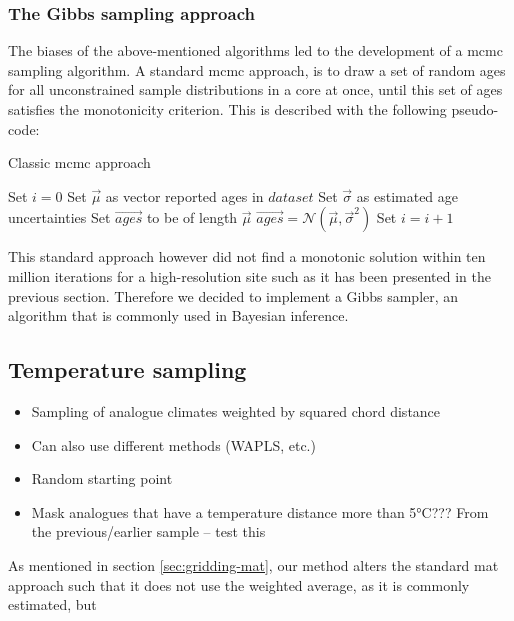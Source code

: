 \begin{refsection}
\subsubsection{The Gibbs sampling approach}
The biases of the above-mentioned algorithms led to the development of a \gls{mcmc} sampling algorithm. A standard \gls{mcmc} approach, is to draw a set of random ages for all unconstrained sample distributions in a core at once, until this set of ages satisfies the monotonicity criterion. This is described with the following pseudo-code:

\begin{algorithm}
	\renewcommand{\algorithmicensure}{\textbf{Output:}}
	\caption[Classic MCMC approach]{Classic \gls{mcmc} approach}
	\label{a:gridding-mcmc}
	\begin{algorithmic}[1]
		\STATE Set $i = 0$
		\STATE Set $\vec{\mu}$ as vector reported ages in $dataset$
		\STATE Set $\vec{\sigma}$ as estimated age uncertainties		
		\STATE Set $\vec{ages}$ to be of length $\vec{\mu}$
		\STATE $\vec{ages} = \mathcal{N}(\vec{\mu}, \vec{\sigma}^2)$
		\STATE Set $i = i + 1$
		\ENDWHILE
		\ENDFOR
	\end{algorithmic}
\end{algorithm}

This standard approach however did not find a monotonic solution within ten million iterations for a high-resolution site such as it has been presented in the previous section. Therefore we decided to implement a Gibbs sampler, an algorithm that is commonly used in Bayesian inference. 

\subsection{Temperature sampling}  \label{sec:gridding-temperature-sampling}
\begin{itemize}
	\item Sampling of analogue climates weighted by squared chord distance
	\item Can also use different methods (WAPLS, etc.)
	\item Random starting point
	\item Mask analogues that have a temperature distance more than 5°C??? From the previous/earlier sample – test this
\end{itemize}
As mentioned in section \ref{sec:gridding-mat}, our method alters the standard \gls{mat} approach such that it does not use the weighted average, as it is commonly estimated, but 


\end{refsection}
